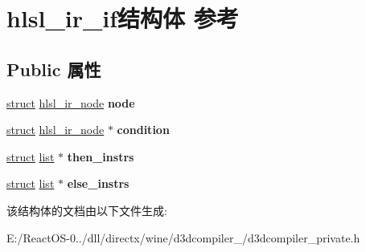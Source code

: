 \hypertarget{structhlsl__ir__if}{}\section{hlsl\+\_\+ir\+\_\+if结构体 参考}
\label{structhlsl__ir__if}
\subsection*{Public 属性}
\begin{DoxyCompactItemize}
\item 
\mbox{\label{structhlsl__ir__if_aa5c9a9245ddfb0e071e44033d1f70863}} 
\hyperlink{interfacestruct}{struct} \hyperlink{structhlsl__ir__node}{hlsl\+\_\+ir\+\_\+node} {\bfseries node}
\item 
\mbox{\label{structhlsl__ir__if_a1953f5b6f0dcc8a55e7be4a5179ec2b7}} 
\hyperlink{interfacestruct}{struct} \hyperlink{structhlsl__ir__node}{hlsl\+\_\+ir\+\_\+node} $\ast$ {\bfseries condition}
\item 
\mbox{\label{structhlsl__ir__if_aea2414c9451634033890c9dcf2583b60}} 
\hyperlink{interfacestruct}{struct} \hyperlink{classlist}{list} $\ast$ {\bfseries then\+\_\+instrs}
\item 
\mbox{\label{structhlsl__ir__if_a6e7ffdd70ae2f226d71255e1e451b68f}} 
\hyperlink{interfacestruct}{struct} \hyperlink{classlist}{list} $\ast$ {\bfseries else\+\_\+instrs}
\end{DoxyCompactItemize}


该结构体的文档由以下文件生成\+:\begin{DoxyCompactItemize}
\item 
E\+:/\+React\+O\+S-\/0../dll/directx/wine/d3dcompiler\+\_/d3dcompiler\+\_\+private.\+h\end{DoxyCompactItemize}
